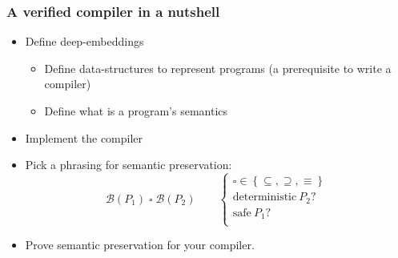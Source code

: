 \documentclass[9pt]{beamer}
\begin{document}
\begin{frame}[fragile]
  \frametitle{A verified compiler in a nutshell}
  \newcommand\behaviors[1]{{\mathcal B}\left(#1\right)}
  \begin{itemize}
  \item Define \alert{deep-embeddings}
    \begin{itemize}
    \item Define data-structures to represent programs (a prerequisite to write a compiler)
    \item Define what is a program's semantics 
    \end{itemize}
    
    \pause
    
  \item Implement the compiler

    \pause

  \item Pick a phrasing for semantic preservation:
    \begin{displaymath}
      \behaviors{P_1} \mathbin{\square} \behaviors{P_2} 
      \qquad  \begin{cases}
        \square \in \left\{\subseteq, \supseteq, \equiv \right\} \\
        \text{deterministic}~P_2 ? \\
        \text{safe}~P_1 ? \\
      \end{cases}
    \end{displaymath}

    \pause

  \item Prove semantic preservation for your compiler. 
    \pause 
{}

  \end{itemize}  
\end{frame}
\end{document}
